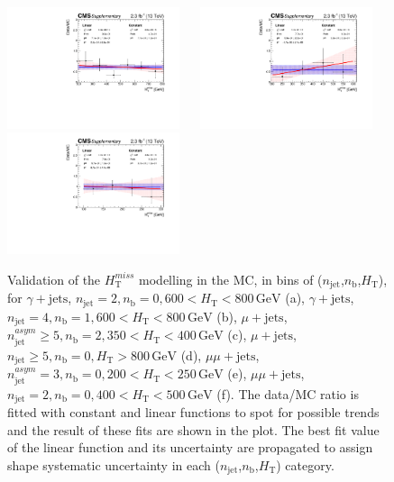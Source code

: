 \clearpage
\begin{figure}[tbhp]
    \caption{ 
    Validation of the $H_{\mathrm{T}}^{miss}$ modelling in the MC, in bins of ($n_{\mathrm{jet}}$,$n_{\mathrm{b}}$,$H_{\mathrm{T}}$), for 
    $\gamma+\mathrm{jets}$, $n_{\mathrm{jet}}=2,n_{\mathrm{b}}=0,600<H_{\mathrm{T}}<800 \, \mathrm{GeV}$ (a),
    $\gamma+\mathrm{jets}$, $n_{\mathrm{jet}}=4,n_{\mathrm{b}}=1,600<H_{\mathrm{T}}<800 \, \mathrm{GeV}$ (b),
    $\mu+\mathrm{jets}$, $n_{\mathrm{jet}}^{asym}\geq5,n_{\mathrm{b}}=2,350<H_{\mathrm{T}}<400 \, \mathrm{GeV}$ (c),
    $\mu+\mathrm{jets}$, $n_{\mathrm{jet}}\geq5,n_{\mathrm{b}}=0,H_{\mathrm{T}}>800 \, \mathrm{GeV}$ (d),
    $\mu\mu+\mathrm{jets}$, $n_{\mathrm{jet}}^{asym}=3,n_{\mathrm{b}}=0,200<H_{\mathrm{T}}<250 \, \mathrm{GeV}$ (e),
    $\mu\mu+\mathrm{jets}$, $n_{\mathrm{jet}}=2,n_{\mathrm{b}}=0,400<H_{\mathrm{T}}<500 \, \mathrm{GeV}$ (f).
    The data/MC ratio is fitted with constant and linear functions to spot for possible 
    trends and the result of these fits are shown in the plot. The best fit value of the linear function and its uncertainty are propagated 
    to assign shape systematic uncertainty in each ($n_{\mathrm{jet}}$,$n_{\mathrm{b}}$,$H_{\mathrm{T}}$) category. 
    \label{fig:mht-validation} }
  \begin{center}
    \includegraphics[width=0.45\textwidth]{mht_eq0b_eq2j_ht_600_800_SinglePhoton_Graph_aux}  ~~
    \includegraphics[width=0.45\textwidth]{mht_eq1b_eq4j_ht_600_800_SinglePhoton_Graph_aux}  \\
    \includegraphics[width=0.45\textwidth]{mht_eq2b_ge5a_ht_350_400_SingleMu_Graph_aux}  ~~

\end{center}
\end{figure}
